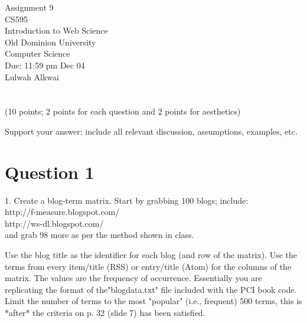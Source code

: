 \documentclass[letterpaper,11pt]{article}
\begin{document}
\begin{titlepage}
\begin{center}
\Huge{Assignment 9}
\\
\Large{CS595}
\\
\Large{Introduction to Web Science}
\\
\Large{Old Dominion University}
\\
\Large{Computer Science}
\\
\Large{Due: 11:59 pm Dec 04}
\\
\Large{Lulwah Alkwai}
\\
\end{center}
\end{titlepage}
\newpage

\section*{}
(10 points; 2 points for each question and 2 points for aesthetics)

Support your answer:
include all relevant discussion, assumptions, examples, etc.

\section*{Question 1}
1.  Create a blog-term matrix.  Start by grabbing 100 blogs; include:\\
http://f-measure.blogspot.com/\\
http://ws-dl.blogspot.com/\\
and grab 98 more as per the method shown in class.

Use the blog title as the identifier for each blog (and row of the matrix).  Use the terms from every item/title (RSS) or entry/title
(Atom) for the columns of the matrix.  The values are the frequency of occurrence.  Essentially you are replicating the format of the"blogdata.txt" file included with the PCI book code.  Limit the number of terms to the most "popular" (i.e., frequent) 500 terms,
this is *after* the criteria on p. 32 (slide 7) has been satisfied.
\newpage
\end{document}
